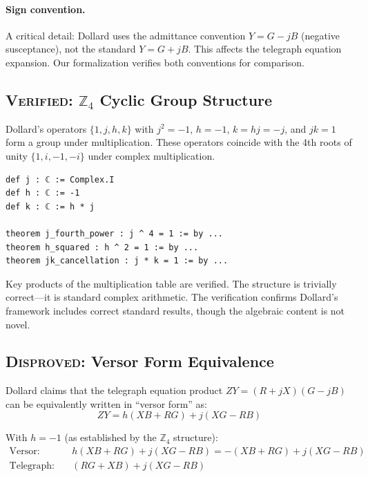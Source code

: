 \documentclass[runningheads]{llncs}
\begin{document}
\paragraph{Sign convention.} A critical detail: Dollard uses the admittance
convention $Y = G - jB$ (negative susceptance), not the standard $Y = G + jB$.
This affects the telegraph equation expansion. Our formalization verifies both
conventions for comparison.

\subsection{\textsc{Verified}: $\mathbb{Z}_4$ Cyclic Group Structure}

Dollard's operators $\{1, j, h, k\}$ with $j^2 = -1$, $h = -1$, $k = hj = -j$,
and $jk = 1$ form a group under multiplication. These operators coincide with
the 4th roots of unity $\{1, i, -1, -i\}$ under complex multiplication.

\begin{lstlisting}[caption={Versor operators as 4th roots of unity (excerpt from \texttt{basic\_operators.lean})}]
def j : ℂ := Complex.I
def h : ℂ := -1
def k : ℂ := h * j

theorem j_fourth_power : j ^ 4 = 1 := by ...
theorem h_squared : h ^ 2 = 1 := by ...
theorem jk_cancellation : j * k = 1 := by ...
\end{lstlisting}

Key products of the multiplication table are verified. The structure is trivially
correct---it is standard complex arithmetic. The verification confirms Dollard's
framework includes correct standard results, though the algebraic content is
not novel.

\subsection{\textsc{Disproved}: Versor Form Equivalence}
\label{sec:disproof}

Dollard claims that the telegraph equation product $ZY = (R + jX)(G - jB)$ can
be equivalently written in ``versor form'' as:
\[
  ZY = h(XB + RG) + j(XG - RB)
\]

With $h = -1$ (as established by the $\mathbb{Z}_4$ structure):
\begin{align*}
  \text{Versor:} \quad & h(XB{+}RG) + j(XG{-}RB) = -(XB{+}RG) + j(XG{-}RB) \\
  \text{Telegraph:} \quad & (RG{+}XB) + j(XG{-}RB)
\end{align*}
\end{document}
